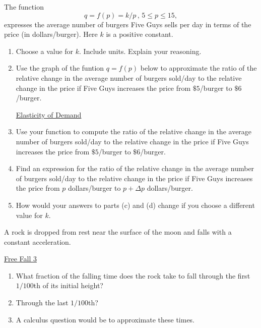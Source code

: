 \documentclass{ximera}
\begin{document}
\begin{question} \label{epf3eee}
The function
\[
 q = f(p) =k/p\, , \, 5\leq p \leq 15,
\]
expresses the average number of burgers Five Guys sells per day in terms of the price (in dollars/burger). Here $k$ is a positive constant.

\begin{enumerate}
\item Choose a value for $k$. Include units. Explain your reasoning.

\item Use the graph of the funtion $q=f(p)$ below to approximate the ratio of the relative change in the average number of burgers sold/day to the relative change in the price if Five Guys increases the price from $\$5$/burger to $\$6$/burger.

\begin{onlineOnly}
    \begin{center}
\end{center}
\end{onlineOnly}

\href{https://www.desmos.com/calculator/vq6p5be1up}{Elasticity of Demand}

\item Use your function to compute the ratio of the relative change in the average number of burgers sold/day to the relative change in the price if Five Guys increases the price from $\$5$/burger to $\$6$/burger.

\item Find an expression for the ratio of the relative change in the average number of burgers sold/day to the relative change in the price if Five Guys increases the price from $p$ dollars/burger to $p+ \Delta p$ dollars/burger.

\item How would your answers to parts (c) and (d) change if you choose a different value for $k$.
\end{enumerate}
\end{question}


\begin{question} \label{Qdff3efr}
A rock is dropped from rest near the surface of the moon and falls with a constant acceleration.

\begin{onlineOnly}
    \begin{center}
\end{center}
\end{onlineOnly}

\href{https://www.desmos.com/calculator/wcgip2k0ai}{Free Fall 3}

\begin{enumerate}
\item What fraction of the falling time does the rock take to fall through the first $1/100$th of its initial height?

\item Through the last $1/100$th? 

\item A calculus question would be to approximate these times. 
\end{enumerate}
\end{question}
\end{document}
